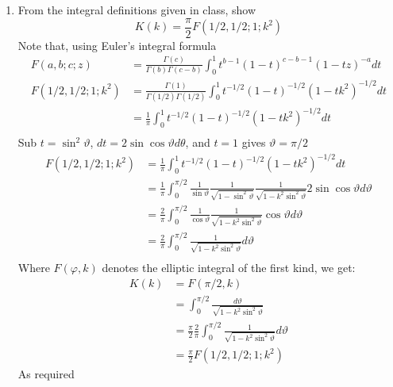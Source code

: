 \documentclass{X:/Documents/Coding/Latex/myassignment}
\begin{document}
\begin{enumerate}
\begin{enumerate}
	\item  From the integral definitions given in class, show
	\[K(k) = \frac{\pi}{2} F(1/2,1/2;1;k^2)\]
	Note that, using Euler's integral formula
	\begin{align*}
		F(a,b;c;z) &= \frac{\Gamma(c)}{\Gamma(b)\Gamma(c-b)} \int_0^1 t^{b-1} (1-t)^{c-b-1} (1-tz)^{-a} dt\\
		F(1/2,1/2;1;k^2) &= \frac{\Gamma(1)}{\Gamma(1/2) \Gamma(1/2)} \int_0^1 t^{-1/2}(1-t)^{-1/2} (1-tk^2)^{-1/2} dt\\
		&= \frac{1}{\pi} \int_0^1 t^{-1/2}(1-t)^{-1/2} (1-tk^2)^{-1/2} dt\\
	\end{align*}
	Sub $t = \sin^2 \vartheta$, $dt = 2\sin\cos\vartheta d\theta$, and $t=1$ gives $\vartheta = \pi/2$
	\begin{align*}
		F(1/2,1/2;1;k^2) &= \frac{1}{\pi} \int_0^1 t^{-1/2}(1-t)^{-1/2} (1-tk^2)^{-1/2} dt\\
		&=\frac1{\pi} \int_0^{\pi/2} \frac{1}{\sin\vartheta} \frac{1}{\sqrt{1-\sin^2\vartheta}} \frac{1}{\sqrt{1-k^2\sin^2\vartheta}}2\sin\cos\vartheta d\vartheta\\
		&= \frac2{\pi} \int_0^{\pi/2}  \frac{1}{\cos\vartheta} \frac{1}{\sqrt{1-k^2\sin^2\vartheta}}\cos\vartheta d\vartheta\\
		&= \frac2{\pi} \int_0^{\pi/2}\frac{1}{\sqrt{1-k^2\sin^2\vartheta}}d\vartheta\\
	\end{align*}
	Where $F(\varphi,k)$ denotes the elliptic integral of the first kind, we get:
	\begin{align*}
		K(k) &= F(\pi/2,k)\\
		&= \int_0^{\pi/2} \frac{d\vartheta}{\sqrt{1-k^2\sin^2\vartheta}}\\
		&= \frac{\pi}{2}\frac2{\pi} \int_0^{\pi/2}\frac{1}{\sqrt{1-k^2\sin^2\vartheta}}d\vartheta\\
		&= \frac{\pi}{2} F\left(1/2,1/2;1;k^2\right)
	\end{align*}
	As required

\end{enumerate}
\end{enumerate}
\end{document}
